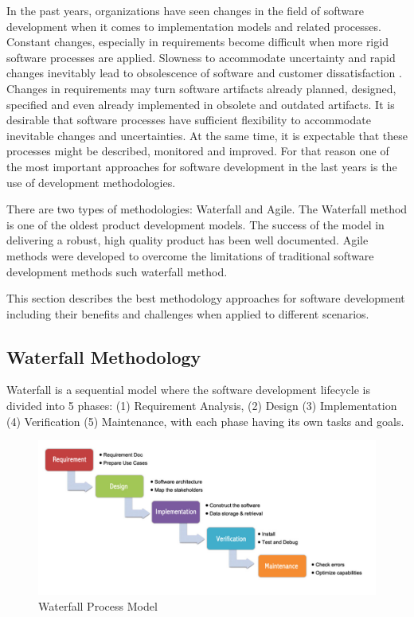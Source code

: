 

In the past years, organizations have seen changes in the field of software development when it comes to implementation models and related processes. Constant changes, especially in requirements become difficult when more rigid software processes are applied. Slowness to accommodate uncertainty and rapid changes inevitably lead to obsolescence of software and customer dissatisfaction \cite{agile:1}. Changes in requirements may turn software artifacts already planned, designed, specified and even already implemented in obsolete and outdated artifacts.
It is desirable that software processes have sufficient flexibility to accommodate inevitable changes and uncertainties. At the same time, it is expectable that these processes might be described, monitored and improved.
For that reason one of the most important approaches for software development in the last years is the use of development methodologies. 

There are two types of methodologies: Waterfall and Agile. The Waterfall method is one of the oldest product development models. The success of the model in delivering a robust, high quality product has been well documented. Agile methods were developed to overcome the limitations of traditional software development methods such waterfall method.

This section describes the best methodology approaches for software development including their benefits and challenges when applied to different scenarios. 

\subsection{Waterfall Methodology}

Waterfall is a sequential model where the software development lifecycle is divided into 5 phases: (1) Requirement Analysis, (2) Design (3) Implementation (4) Verification (5) Maintenance, with each phase having its own tasks and goals. 

\begin{figure}[h]
    \centering
    \includegraphics[width=\textwidth]{Waterfall}
    \caption{Waterfall Process Model}
    \label{fig:waterfall}
\end{figure}

